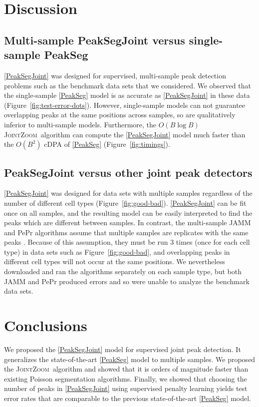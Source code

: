 \documentclass{article} %
\newcommand{\JointHeuristic}{\textsc{JointZoom}}
\begin{document}
\section{Discussion}
\label{sec:discussion}

\subsection{Multi-sample PeakSegJoint versus single-sample PeakSeg}

\ref{PeakSegJoint} was designed for supervised, multi-sample peak
detection problems such as the benchmark data sets that we
considered. We observed that the single-sample \ref{PeakSeg} model is
as accurate as \ref{PeakSegJoint} in these data
(Figure~\ref{fig:test-error-dots}). However, single-sample models can
not guarantee overlapping peaks at the same positions across
samples, so are qualitatively inferior to multi-sample
models. Furthermore, the $O(B \log B)$ \JointHeuristic\ algorithm can
compute the \ref{PeakSegJoint} model much faster than the $O(B^2)$
cDPA of \ref{PeakSeg} (Figure~\ref{fig:timings}).

\subsection{PeakSegJoint versus other joint peak detectors}

\ref{PeakSegJoint} was designed for data sets with multiple samples
regardless of the number of different cell types
(Figure~\ref{fig:good-bad}). \ref{PeakSegJoint} can be fit once on all
samples, and the resulting model can be easily interpreted to find the
peaks which are different between samples. In contrast, the
multi-sample JAMM and PePr algorithms assume that multiple samples are
replicates with the same peaks \citep{JAMM, PePr}. Because of this
assumption, they must be run 3 times (once for each cell type) in 
data sets such as Figure~\ref{fig:good-bad}, and overlapping peaks in
different cell types will not occur at the same positions. We
nevertheless downloaded and ran the algorithms separately on each
sample type, but both JAMM and PePr produced errors and so were unable
to analyze the benchmark data sets.

\section{Conclusions}
\label{sec:conclusions}

We proposed the \ref{PeakSegJoint} model for supervised joint peak
detection. It generalizes the state-of-the-art \ref{PeakSeg} model to
multiple samples. We proposed the \JointHeuristic\ algorithm and
showed that it is orders of magnitude faster than existing Poisson
segmentation algorithms. Finally, we showed that choosing the number
of peaks in \ref{PeakSegJoint} using supervised penalty learning
yields test error rates that are comparable to the previous
state-of-the-art \ref{PeakSeg} model.
\end{document}
